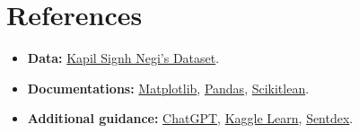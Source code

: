 \documentclass[12pt]{article}
\begin{document}
\section{References}
\begin{itemize}
    \item \textbf{Data:} \href{https://github.com/kapilsinghnegi/Fake-News-Detection/tree/main/Datasets}{Kapil Signh Negi's Dataset}.
    \item \textbf{Documentations:} \href{https://matplotlib.org/stable/users/index.html}{Matplotlib}, \href{https://pandas.pydata.org/docs/}{Pandas}, \href{https://scikit-learn.org/dev/api/sklearn.linear_model.html}{Scikitlean}.
    \item \textbf{Additional guidance:} \href{https://chatgpt.com/}{ChatGPT}, \href{https://www.kaggle.com/learn}{Kaggle Learn}, \href{https://www.youtube.com/@sentdex}{Sentdex}.
\end{itemize}
\end{document}

